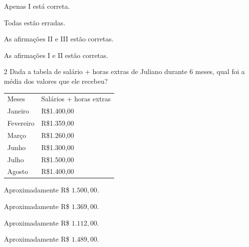 \begin{escolha}[itemsep=0pt]
\item Apenas I está correta.
\item Todas estão erradas.
\item As afirmações II e III estão corretas.
\item As afirmações I e II estão corretas.
\end{escolha}



\num{2} Dada a tabela de salário + horas extras de Juliano durante 6 meses,
qual foi a média dos valores que ele recebeu?

\begin{longtable}[]{@{}ll@{}}
\toprule
\endhead
Meses & Salários + horas extras\tabularnewline
Janeiro & R\$1.400,00\tabularnewline
Fevereiro & R\$1.359,00\tabularnewline
Março & R\$1.260,00\tabularnewline
Junho & R\$1.300,00\tabularnewline
Julho & R\$1.500,00\tabularnewline
Agosto & R\$1.400,00\tabularnewline
\bottomrule
\end{longtable}

\begin{escolha}[itemsep=0pt]
\item Aproximadamente R\$ $1.500,00$.
\item Aproximadamente R\$ $1.369,00$.
\item Aproximadamente R\$ $1.112,00$.
\item Aproximadamente R\$ $1.489,00$.
\end{escolha}


